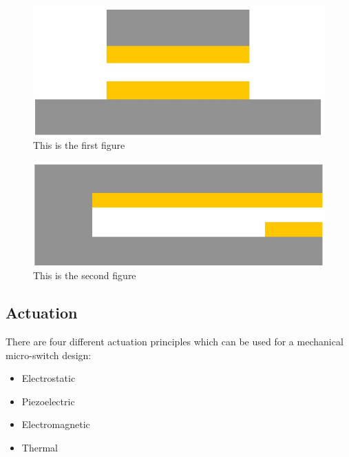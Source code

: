 \begin{minipage}{\linewidth}
	\centering
	\begin{minipage}{0.35\linewidth}
		\begin{figure}[H]
	    	\includegraphics[width=\linewidth]{fig/cant_single_front.jpg}
	    	\caption{This is the first figure}
            \label{fig:cant_single_front}
		\end{figure}
	\end{minipage}
	\hspace{0.05\linewidth}
	\begin{minipage}{0.35\linewidth}
		\begin{figure}[H]
	    	\includegraphics[width=\linewidth]{fig/cant_single_side.jpg}
	    	\caption{This is the second figure}
            \label{fig:cant_single_side}
		\end{figure}
	\end{minipage}
\end{minipage}

\subsection{Actuation}
\label{sec:actuation}
There are four different actuation principles which can be used for a mechanical micro-switch design:
\begin{itemize}
  \item Electrostatic
  \item Piezoelectric
  \item Electromagnetic
  \item Thermal
\end{itemize}

